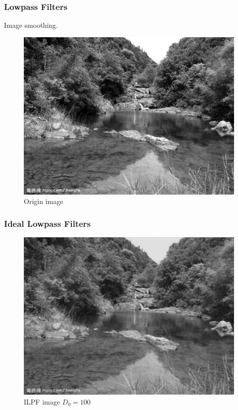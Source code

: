 \documentclass[notheorems, serif, table, compress]{beamer}  %
\begin{document}
\begin{frame}
\frametitle{Lowpass Filters}
Image smoothing.%
\begin{figure}
 \centering
 \caption{Origin image}
 \includegraphics[width=0.8\linewidth]{orgn.png} 
 \end{figure}
 \end{frame}

\begin{frame}
\frametitle{Ideal Lowpass Filters}
\begin{figure}
 \centering
 \caption{ILPF image $D_{0}=100$}
 \includegraphics[width=0.8\linewidth]{ilpf.png} 
 \end{figure}
\end{frame}
\end{document}
